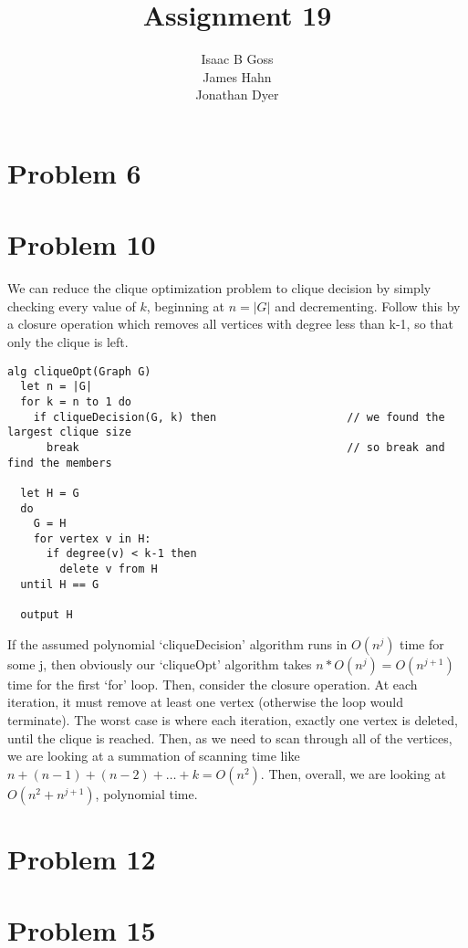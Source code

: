 \documentclass{article}
\author{Isaac B Goss\\ James Hahn\\ Jonathan Dyer}
\title{Assignment 19}
\providecommand{\prob}[1]{\section*{Problem #1}}
\begin{document}
\maketitle
\prob{6}




\prob{10}
We can reduce the clique optimization problem to clique decision by simply checking every value of $k$, 
beginning at $n = |G|$ and decrementing.
Follow this by a closure operation which removes all vertices with degree less than k-1,
so that only the clique is left.
\begin{lstlisting}
alg cliqueOpt(Graph G)
  let n = |G|
  for k = n to 1 do
    if cliqueDecision(G, k) then                    // we found the largest clique size
      break                                         // so break and find the members

  let H = G
  do
    G = H
    for vertex v in H:
      if degree(v) < k-1 then
        delete v from H
  until H == G

  output H
\end{lstlisting}
If the assumed polynomial `cliqueDecision' algorithm runs in $O(n^j)$ time for some j, 
then obviously our `cliqueOpt' algorithm takes $n*O(n^j) = O(n^{j+1})$ time for the first `for' loop.
Then, consider the closure operation.
At each iteration, it must remove at least one vertex (otherwise the loop would terminate).
The worst case is where each iteration, exactly one vertex is deleted, until the clique is reached.
Then, as we need to scan through all of the vertices, 
we are looking at a summation of scanning time like $n + (n-1) + (n-2) + \dots + k = O(n^2)$.
Then, overall, we are looking at $O(n^2 + n^{j+1})$, polynomial time.


\prob{12}



\prob{15}
\end{document}
